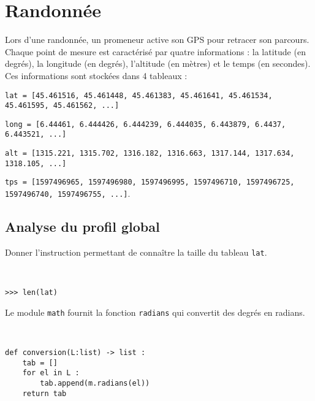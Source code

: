 \section{Randonnée}
\ifprof
\else
Lors d'une randonnée, un promeneur active son GPS pour retracer son parcours. Chaque point de mesure est caractérisé par quatre informations : la latitude (en degrés), la longitude (en degrés), l'altitude (en mètres) et le temps (en secondes). 
Ces informations sont stockées dans 4  tableaux :

\noindent \texttt{lat = [45.461516, 45.461448, 45.461383, 45.461641, 45.461534, 45.461595, 45.461562, ...]}

\noindent \texttt{long = [6.44461, 6.444426, 6.444239, 6.444035, 6.443879, 6.4437, 6.443521, ...]}

\noindent \texttt{alt = [1315.221, 1315.702, 1316.182, 1316.663, 1317.144, 1317.634, 1318.105, ...]}

\noindent \texttt{tps = [1597496965, 1597496980, 1597496995, 1597496710, 1597496725, 1597496740, 1597496755, ...]}.

\fi

\subsection{Analyse du profil global}



\question{} Donner l'instruction permettant de connaître la taille du tableau \texttt{lat}.
\ifprof
\begin{corrige}~\\
\vspace{-.5cm}
\begin{lstlisting}
>>> len(lat)
\end{lstlisting}
\end{corrige}
\else
\fi

Le module \texttt{math} fournit la fonction \texttt{radians} qui convertit des degrés en radians.


\ifprof
\begin{corrige}~\\
\vspace{-.5cm}
\begin{lstlisting}
def conversion(L:list) -> list : 
    tab = []
    for el in L : 
        tab.append(m.radians(el))
    return tab
\end{lstlisting}
\end{corrige}
\else
\fi

